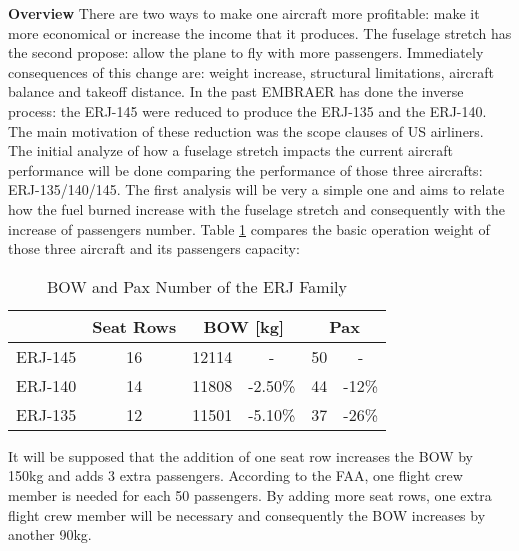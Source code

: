 ﻿\textbf{Overview}
There are two ways to make one aircraft more profitable: make it more economical or increase the income that it produces. The fuselage stretch has the second propose: allow the plane to fly with more passengers. Immediately consequences of this change are: weight increase, structural limitations, aircraft balance and takeoff distance.
In the past EMBRAER has done the inverse process: the ERJ-145 were reduced to produce the ERJ-135 and the ERJ-140. The main motivation of these reduction was the scope clauses of US airliners. The initial analyze of how a fuselage stretch impacts the current aircraft performance will be done comparing the performance of those three aircrafts: ERJ-135/140/145. The first analysis will be very a simple one and aims to relate how the fuel burned increase with the fuselage stretch and consequently with the increase of passengers number.
	Table \ref{tab:BOW} compares the basic operation weight of those three aircraft and its passengers capacity:

\begin{table}[htbp]
  \centering
  \caption{BOW and Pax Number of the ERJ Family}
    \begin{tabular}{cccccc}
    \toprule
          & Seat Rows & \multicolumn{2}{c}{BOW [kg]} & \multicolumn{2}{c}{Pax} \\
    \midrule
    ERJ-145 & 16    & 12114 & -     & 50    & - \\
    ERJ-140 & 14    & 11808 & -2.50\% & 44    & -12\% \\
    ERJ-135 & 12    & 11501 & -5.10\% & 37    & -26\% \\
    \bottomrule
    \end{tabular}%
  \label{tab:BOW}%
\end{table}%

It will be supposed that the addition of one seat row increases the BOW by 150kg and adds 3 extra passengers. According to the FAA, one flight crew member is needed for each 50 passengers. By adding more seat rows, one extra flight crew member will be necessary and consequently the BOW increases by another 90kg.

